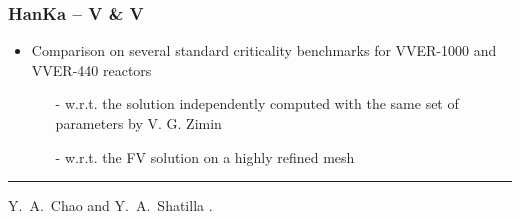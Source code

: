 \begin{frame}[c]
  \frametitle{HanKa -- V \& V}
 
 \begin{itemize}
    \item Comparison on several standard criticality benchmarks for VVER-1000 and VVER-440 reactors
        \begin{itemize}
            \item[-] w.r.t. the solution independently computed with the same set of parameters by V. G. Zimin
            \item[-] w.r.t. the FV solution on a highly refined mesh
        \end{itemize}
  \end{itemize}      
  \vspace{3cm} \hrule width 5.1cm \vspace{-0.1cm}
	\begin{thebibliography}{\textwidth} 
	  \beamertemplatearticlebibitems
    {\footnotesize Y.~A.~Chao and Y.~A.~Shatilla}
    . 
	\end{thebibliography}
\end{frame}
